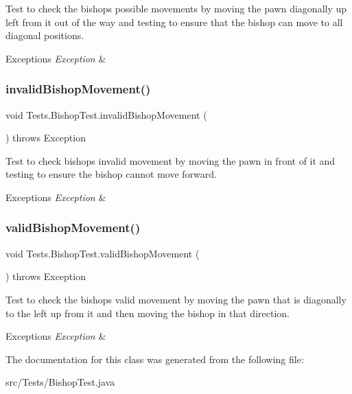 Test to check the bishop\textquotesingle{}s possible movements by moving the pawn diagonally up left from it out of the way and testing to ensure that the bishop can move to all diagonal positions. 
\begin{DoxyExceptions}{Exceptions}
{\em Exception} & \\
\hline
\end{DoxyExceptions}
\hypertarget{class_tests_1_1_bishop_test_a3f1b2164ce04847f236b47960a2d6507}{}\label{class_tests_1_1_bishop_test_a3f1b2164ce04847f236b47960a2d6507} 
\subsubsection{\texorpdfstring{invalid\+Bishop\+Movement()}{invalidBishopMovement()}}
{\footnotesize\ttfamily void Tests.\+Bishop\+Test.\+invalid\+Bishop\+Movement (\begin{DoxyParamCaption}{ }\end{DoxyParamCaption}) throws Exception}

Test to check bishop\textquotesingle{}s invalid movement by moving the pawn in front of it and testing to ensure the bishop cannot move forward. 
\begin{DoxyExceptions}{Exceptions}
{\em Exception} & \\
\hline
\end{DoxyExceptions}
\hypertarget{class_tests_1_1_bishop_test_a5966af2d7a4cf4409a7c9e04e14be402}{}\label{class_tests_1_1_bishop_test_a5966af2d7a4cf4409a7c9e04e14be402} 
\subsubsection{\texorpdfstring{valid\+Bishop\+Movement()}{validBishopMovement()}}
{\footnotesize\ttfamily void Tests.\+Bishop\+Test.\+valid\+Bishop\+Movement (\begin{DoxyParamCaption}{ }\end{DoxyParamCaption}) throws Exception}

Test to check the bishop\textquotesingle{}s valid movement by moving the pawn that is diagonally to the left up from it and then moving the bishop in that direction. 
\begin{DoxyExceptions}{Exceptions}
{\em Exception} & \\
\hline
\end{DoxyExceptions}


The documentation for this class was generated from the following file\+:\begin{DoxyCompactItemize}
\item 
src/\+Tests/Bishop\+Test.\+java\end{DoxyCompactItemize}
